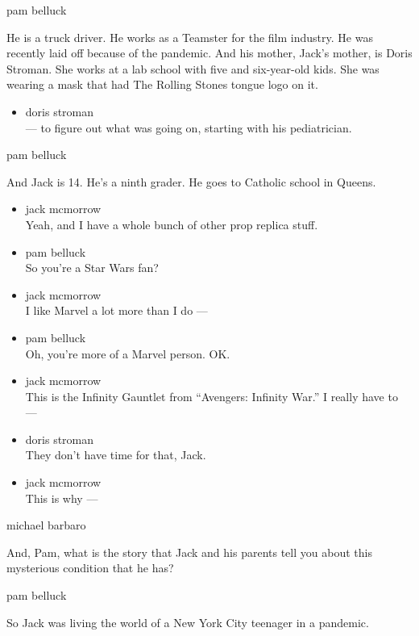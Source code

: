 pam belluck

He is a truck driver. He works as a Teamster for the film industry. He
was recently laid off because of the pandemic. And his mother, Jack's
mother, is Doris Stroman. She works at a lab school with five and
six-year-old kids. She was wearing a mask that had The Rolling Stones
tongue logo on it.

\begin{itemize}
\tightlist
\item
  doris stroman\\
  --- to figure out what was going on, starting with his pediatrician.
\end{itemize}

pam belluck

And Jack is 14. He's a ninth grader. He goes to Catholic school in
Queens.

\begin{itemize}
\item
  jack mcmorrow\\
  Yeah, and I have a whole bunch of other prop replica stuff.
\item
  pam belluck\\
  So you're a Star Wars fan?
\item
  jack mcmorrow\\
  I like Marvel a lot more than I do ---
\item
  pam belluck\\
  Oh, you're more of a Marvel person. OK.
\item
  jack mcmorrow\\
  This is the Infinity Gauntlet from ``Avengers: Infinity War.'' I
  really have to ---
\item
  doris stroman\\
  They don't have time for that, Jack.
\item
  jack mcmorrow\\
  This is why ---
\end{itemize}

michael barbaro

And, Pam, what is the story that Jack and his parents tell you about
this mysterious condition that he has?

pam belluck

So Jack was living the world of a New York City teenager in a pandemic.

